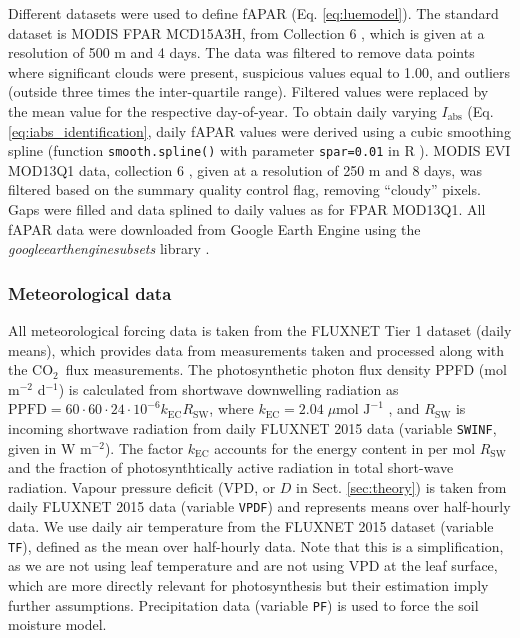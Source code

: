 \documentclass{myreport}
\newcommand{\coo}{CO$_2$}
\begin{document}
Different datasets were used to define fAPAR (Eq. \ref{eq:luemodel}). The standard dataset is MODIS FPAR MCD15A3H, from Collection 6 \citep{modis_fpar_6}, which is given at a resolution of 500 m and 4 days. The data was filtered to remove data points where significant clouds were present, suspicious values equal to 1.00, and outliers (outside three times the inter-quartile range). Filtered values were replaced by the mean value for the respective day-of-year. To obtain daily varying $I_\text{abs}$ (Eq. \ref{eq:iabs_identification}, daily fAPAR values were derived using a cubic smoothing spline (function \texttt{smooth.spline()} with parameter \texttt{spar=0.01} in R \citep{Rcoreteam}). MODIS EVI MOD13Q1 data, collection 6 \citep{modis_evi_6}, given at a resolution of 250 m and 8 days, was filtered based on the summary quality control flag, removing ``cloudy'' pixels. Gaps were filled and data splined to daily values as for FPAR MOD13Q1. All fAPAR data were downloaded from Google Earth Engine using the \textit{google\textunderscore earth\textunderscore engine\textunderscore subsets} library \citep{gee_subset}. 

\subsubsection{Meteorological data}
\label{sec:ppfd}
All meteorological forcing data is taken from the FLUXNET Tier 1 dataset (daily means), which provides data from measurements taken and processed along with the \coo\ flux measurements. The photosynthetic photon flux density PPFD (mol m$^{-2}$ d$^{-1}$) is calculated from shortwave downwelling radiation as $\text{PPFD} = 60 \cdot 60 \cdot 24 \cdot 10^{-6} k_\text{EC} R_{\text{SW}}$, where $k_\text{EC} = 2.04\; \mu \text{mol J}^{-1}$ \citep{meek84}, and $R_{\text{SW}}$ is incoming shortwave radiation from daily FLUXNET 2015 data (variable \texttt{SW\textunderscore IN\textunderscore F}, given in W m$^{-2}$). The factor $k_\text{EC}$ accounts for the energy content in per mol $R_\text{SW}$ and the fraction of photosynthtically active radiation in total short-wave radiation. Vapour pressure deficit (VPD, or $D$ in Sect. \ref{sec:theory}) is taken from daily FLUXNET 2015 data (variable \texttt{VPD\textunderscore F}) and represents means over half-hourly data. We use daily air temperature from the FLUXNET 2015 dataset (variable \texttt{T\textunderscore F}), defined as the mean over half-hourly data. Note that this is a simplification, as we are not using leaf temperature and are not using VPD at the leaf surface, which are more directly relevant for photosynthesis but their estimation imply further assumptions. Precipitation data (variable \texttt{P\textunderscore F}) is used to force the soil moisture model.
\end{document}
